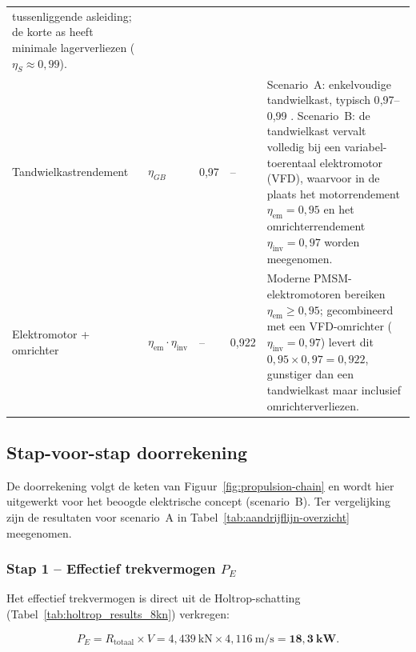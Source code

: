 \begin{table}[H]
\begin{tabular}{p{3.2cm} l p{1.2cm} p{1.2cm} p{6.0cm}}
              tussenliggende asleiding; de korte as heeft minimale
              lagerverliezen ($\eta_S \approx 0{,}99$). \\[6pt]
        Tandwielkastrendement
            & $\eta_{GB}$
            & 0{,}97
            & –
            & Scenario~A: enkelvoudige tandwielkast, typisch 0{,}97--0{,}99
              \cite{Molland2011}. Scenario~B: de tandwielkast vervalt volledig
              bij een variabel-toerentaal elektromotor (VFD), waarvoor in
              de plaats het motorrendement $\eta_\mathrm{em} = 0{,}95$ en het
              omrichterrendement $\eta_\mathrm{inv} = 0{,}97$ worden
              meegenomen. \\[6pt]
        Elektromotor + omrichter
            & $\eta_\mathrm{em} \cdot \eta_\mathrm{inv}$
            & –
            & 0{,}922
            & Moderne PMSM-elektromotoren bereiken $\eta_\mathrm{em} \geq 0{,}95$;
              gecombineerd met een VFD-omrichter ($\eta_\mathrm{inv} = 0{,}97$)
              levert dit $0{,}95 \times 0{,}97 = 0{,}922$, gunstiger dan een
              tandwielkast maar inclusief omrichterverliezen. \\
        \bottomrule
    \end{tabular}
\end{table}
 
\subsection{Stap-voor-stap doorrekening}
\label{subsec:aandrijflijn-berekening}
 
De doorrekening volgt de keten van Figuur~\ref{fig:propulsion-chain} en wordt hier uitgewerkt
voor het beoogde elektrische concept (scenario~B). Ter vergelijking zijn de resultaten voor
scenario~A in Tabel~\ref{tab:aandrijflijn-overzicht} meegenomen.
 
\subsubsection*{Stap 1 – Effectief trekvermogen $P_E$}
 
Het effectief trekvermogen is direct uit de Holtrop-schatting
(Tabel~\ref{tab:holtrop_results_8kn}) verkregen:
 
\begin{equation}
    P_E = R_\mathrm{totaal} \times V
        = 4{,}439\ \mathrm{kN} \times 4{,}116\ \mathrm{m/s}
        = \mathbf{18{,}3}\ \mathbf{kW}.
    \label{eq:PE}
\end{equation}
 
